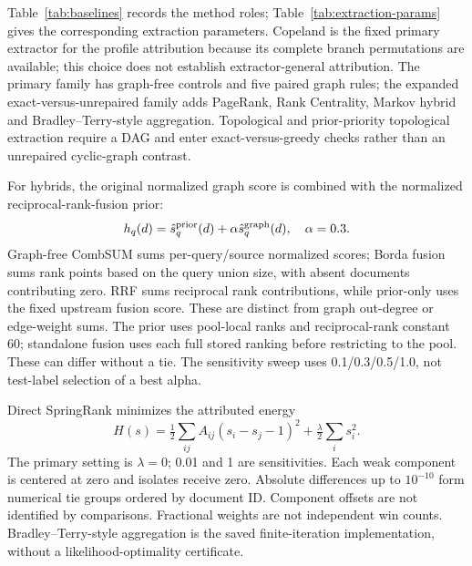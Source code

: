 \documentclass[pdflatex,sn-basic,Numbered]{sn-jnl}
\begin{document}
Table~\ref{tab:baselines} records the method roles; Table~\ref{tab:extraction-params} gives the corresponding extraction parameters. Copeland is the fixed primary extractor for the profile attribution because its complete branch permutations are available; this choice does not establish extractor-general attribution. The primary family has graph-free controls and five paired graph rules; the expanded exact-versus-unrepaired family adds PageRank, Rank Centrality, Markov hybrid and Bradley--Terry-style aggregation. Topological and prior-priority topological extraction require a DAG and enter exact-versus-greedy checks rather than an unrepaired cyclic-graph contrast.


For hybrids, the original normalized graph score is combined with the normalized reciprocal-rank-fusion prior:
\begin{equation}
h_q(d)=\hat s_q^{\rm prior}(d)+\alpha\hat s_q^{\rm graph}(d),\quad\alpha=0.3.
\label{eq:si-hybrid}
\end{equation}
Graph-free CombSUM sums per-query/source normalized scores; Borda fusion sums rank points based on the query union size, with absent documents contributing zero. RRF sums reciprocal rank contributions, while prior-only uses the fixed upstream fusion score. These are distinct from graph out-degree or edge-weight sums. The prior uses pool-local ranks and reciprocal-rank constant 60; standalone fusion uses each full stored ranking before restricting to the pool. These can differ without a tie. The sensitivity sweep uses 0.1/0.3/0.5/1.0, not test-label selection of a best alpha.

Direct SpringRank minimizes the attributed energy \cite{debacco2018springrank}
\begin{equation}
H(s)=\tfrac12\sum_{ij}A_{ij}(s_i-s_j-1)^2+\tfrac\lambda2\sum_i s_i^2.
\label{eq:si-springrank}
\end{equation}
The primary setting is $\lambda=0$; 0.01 and 1 are sensitivities. Each weak component is centered at zero and isolates receive zero. Absolute differences up to $10^{-10}$ form numerical tie groups ordered by document ID. Component offsets are not identified by comparisons. Fractional weights are not independent win counts. Bradley--Terry-style aggregation is the saved finite-iteration implementation, without a likelihood-optimality certificate.
\end{document}
